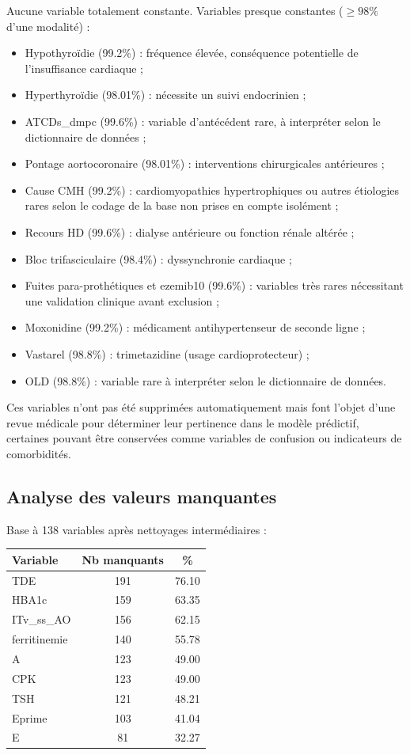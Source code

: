 \documentclass[12pt,a4paper]{report}
\begin{document}
Aucune variable totalement constante. Variables presque constantes ($\ge 98\%$ d'une modalité) :
\begin{itemize}[leftmargin=*]
 \item Hypothyroïdie (99.2\%) : fréquence élevée, conséquence potentielle de l'insuffisance cardiaque ;
 \item Hyperthyroïdie (98.01\%) : nécessite un suivi endocrinien ;
 \item ATCDs\_dmpc (99.6\%) : variable d'antécédent rare, à interpréter selon le dictionnaire de données ;
 \item Pontage aortocoronaire (98.01\%) : interventions chirurgicales antérieures ;
 \item Cause CMH (99.2\%) : cardiomyopathies hypertrophiques ou autres étiologies rares selon le codage de la base non prises en compte isolément ;
 \item Recours HD (99.6\%) : dialyse antérieure ou fonction rénale altérée ;
 \item Bloc trifasciculaire (98.4\%) : dyssynchronie cardiaque ;
 \item Fuites para-prothétiques et ezemib10 (99.6\%) : variables très rares nécessitant une validation clinique avant exclusion ;
 \item Moxonidine (99.2\%) : médicament antihypertenseur de seconde ligne ;
 \item Vastarel (98.8\%) : trimetazidine (usage cardioprotecteur) ;
 \item OLD (98.8\%) : variable rare à interpréter selon le dictionnaire de données.
\end{itemize}

Ces variables n'ont pas été supprimées automatiquement mais font l'objet d'une revue médicale
pour déterminer leur pertinence dans le modèle prédictif, certaines pouvant être conservées
comme variables de confusion ou indicateurs de comorbidités.

\subsection{Analyse des valeurs manquantes}

Base à 138 variables après nettoyages intermédiaires :

\begin{center}
\renewcommand{\arraystretch}{1.2}
\begin{tabular}{@{}l c c@{}}
\toprule
\textbf{Variable} & \textbf{Nb manquants} & \textbf{\%} \\
\midrule
TDE & 191 & 76.10 \\
HBA1c & 159 & 63.35 \\
ITv\_ss\_AO & 156 & 62.15 \\
ferritinemie & 140 & 55.78 \\
A & 123 & 49.00 \\
CPK & 123 & 49.00 \\
TSH & 121 & 48.21 \\
Eprime & 103 & 41.04 \\
E & 81 & 32.27 \\
\bottomrule
\end{tabular}
\end{center}
\end{document}
